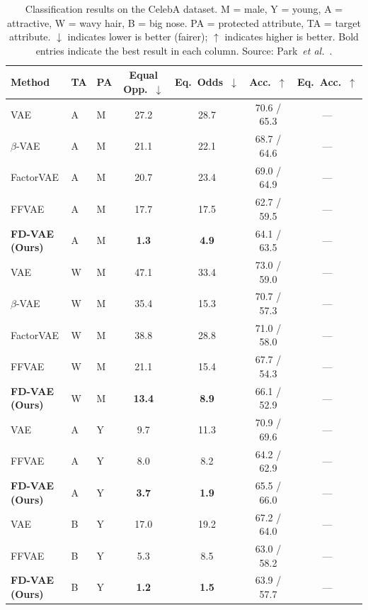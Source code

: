 \begin{table}[htbp]
    \centering
    \caption{%
        Classification results on the CelebA dataset. M = male, Y = young, A = attractive,
        W = wavy hair, B = big nose. PA = protected attribute, TA = target attribute.
        $\downarrow$ indicates lower is better (fairer); $\uparrow$ indicates higher is better.
        Bold entries indicate the best result in each column. Source: Park~\emph{et al.}~\cite{park2020readme}.
    }
    \label{tab:celeba-results}
    \small
    \setlength{\tabcolsep}{5pt}
    \begin{tabular}{lllcccc}
        \toprule
        \textbf{Method} & \textbf{TA} & \textbf{PA} &
        \textbf{Equal Opp.~$\downarrow$} & \textbf{Eq.\ Odds~$\downarrow$} &
        \textbf{Acc.~$\uparrow$} & \textbf{Eq.\ Acc.~$\uparrow$} \\
        \midrule
        VAE             & A & M & 27.2 & 28.7 & 70.6 / 65.3 & --- \\
        $\beta$-VAE     & A & M & 21.1 & 22.1 & 68.7 / 64.6 & --- \\
        FactorVAE       & A & M & 20.7 & 23.4 & 69.0 / 64.9 & --- \\
        FFVAE           & A & M & 17.7 & 17.5 & 62.7 / 59.5 & --- \\
        \textbf{FD-VAE (Ours)} & A & M & \textbf{1.3} & \textbf{4.9} & 64.1 / 63.5 & --- \\
        \midrule
        VAE             & W & M & 47.1 & 33.4 & 73.0 / 59.0 & --- \\
        $\beta$-VAE     & W & M & 35.4 & 15.3 & 70.7 / 57.3 & --- \\
        FactorVAE       & W & M & 38.8 & 28.8 & 71.0 / 58.0 & --- \\
        FFVAE           & W & M & 21.1 & 15.4 & 67.7 / 54.3 & --- \\
        \textbf{FD-VAE (Ours)} & W & M & \textbf{13.4} & \textbf{8.9}  & 66.1 / 52.9 & --- \\
        \midrule
        VAE             & A & Y &  9.7 & 11.3 & 70.9 / 69.6 & --- \\
        FFVAE           & A & Y &  8.0 &  8.2 & 64.2 / 62.9 & --- \\
        \textbf{FD-VAE (Ours)} & A & Y & \textbf{3.7} & \textbf{1.9} & 65.5 / 66.0 & --- \\
        \midrule
        VAE             & B & Y & 17.0 & 19.2 & 67.2 / 64.0 & --- \\
        FFVAE           & B & Y &  5.3 &  8.5 & 63.0 / 58.2 & --- \\
        \textbf{FD-VAE (Ours)} & B & Y & \textbf{1.2} & \textbf{1.5} & 63.9 / 57.7 & --- \\
        \bottomrule
    \end{tabular}
\end{table}

